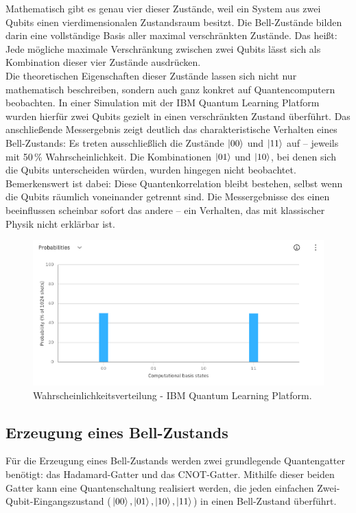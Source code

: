 Mathematisch gibt es genau vier dieser Zustände, weil ein System aus zwei Qubits einen vierdimensionalen Zustandsraum besitzt. Die Bell-Zustände bilden darin eine vollständige Basis aller maximal verschränkten Zustände. Das heißt: Jede mögliche maximale Verschränkung zwischen zwei Qubits lässt sich als Kombination dieser vier Zustände ausdrücken.
\\


Die theoretischen Eigenschaften dieser Zustände lassen sich nicht nur mathematisch beschreiben, sondern auch ganz konkret auf Quantencomputern beobachten. In einer Simulation mit der IBM Quantum Learning Platform wurden hierfür zwei Qubits gezielt in einen verschränkten Zustand überführt. Das anschließende Messergebnis zeigt deutlich das charakteristische Verhalten eines Bell-Zustands: Es treten ausschließlich die Zustände \(\ket{00}\) und \(\ket{11}\) auf – jeweils mit 50\,\% Wahrscheinlichkeit. Die Kombinationen \(\ket{01}\) und \(\ket{10}\), bei denen sich die Qubits unterscheiden würden, wurden hingegen nicht beobachtet. Bemerkenswert ist dabei: Diese Quantenkorrelation bleibt bestehen, selbst wenn die Qubits räumlich voneinander getrennt sind. Die Messergebnisse des einen beeinflussen scheinbar sofort das andere – ein Verhalten, das mit klassischer Physik nicht erklärbar ist.

\begin{figure}[ht]
    \centering
    \includegraphics[width=1\textwidth]{images/quantum-information/results_ibm.png}
    \caption{Wahrscheinlichkeitsverteilung - IBM Quantum Learning Platform.}
    \label{fig:meinbild}
\end{figure}


\subsection{Erzeugung eines Bell-Zustands}
Für die Erzeugung eines Bell-Zustands werden zwei grundlegende Quantengatter benötigt: das Hadamard-Gatter und das CNOT-Gatter. Mithilfe dieser beiden Gatter kann eine Quantenschaltung realisiert werden, die jeden einfachen Zwei-Qubit-Eingangszustand (\(\ket{00}, \ket{01}, \ket{10}, \ket{11}\)) in einen Bell-Zustand überführt.

